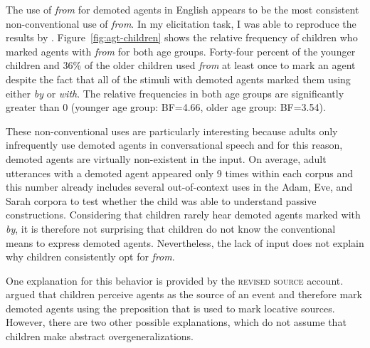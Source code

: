 \documentclass[lucida]{sp} %
\begin{document}
The use of \textit{from} for demoted agents in English appears to be the most consistent non-conventional use of \textit{from}. In my elicitation task, I was able to reproduce the results by \cite{clark1989b}. Figure~\ref{fig:agt-children} shows the relative frequency of children who marked agents with \textit{from} for both age groups. Forty-four percent of the younger children and 36\% of the older children used \textit{from} at least once to mark an agent despite the fact that all of the stimuli with demoted agents marked them using either \textit{by} or \textit{with}. The relative frequencies in both age groups are significantly greater than 0 (younger age group: BF=4.66, older age group: BF=3.54).

These non-conventional uses are particularly interesting because adults only infrequently use demoted agents in conversational speech and for this reason, demoted agents are virtually non-existent in the input. On average, adult utterances with a demoted agent appeared only 9 times within each corpus and this number already includes several out-of-context uses in the Adam, Eve, and Sarah corpora to test whether the child was able to understand passive constructions. Considering that children rarely hear demoted agents marked with \textit{by}, it is therefore not surprising that children do not know the conventional means to express demoted agents. Nevertheless, the lack of input does not explain why children consistently opt for \textit{from}.

One explanation for this behavior is provided by the \textsc{revised source} account. \cite{clark1989a} argued that children perceive agents as the source of an event and therefore mark demoted agents using the preposition that is used to mark locative sources. However, there are two other possible explanations, which do not assume that children make abstract overgeneralizations. 
\end{document}
